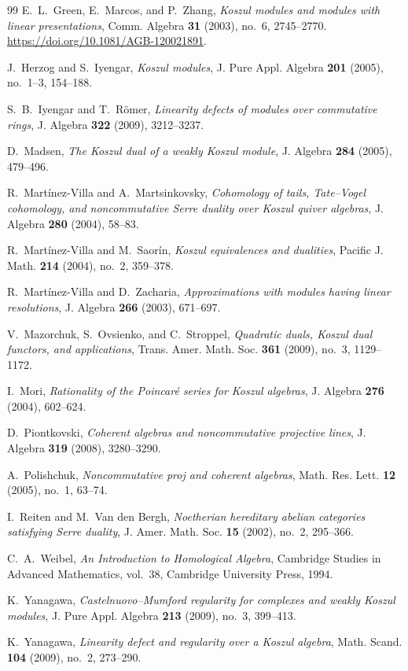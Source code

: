 \documentclass[11pt]{article}
\theoremstyle{definition}
\theoremstyle{remark}
\begin{document}
\begin{thebibliography}{99}
E.~L.~Green, E.~Marcos, and P.~Zhang,
\emph{Koszul modules and modules with linear presentations},
Comm. Algebra \textbf{31} (2003), no.~6, 2745--2770.
\url{https://doi.org/10.1081/AGB-120021891}.

J.~Herzog and S.~Iyengar,
\emph{Koszul modules},
J. Pure Appl. Algebra \textbf{201} (2005), no.~1--3, 154--188.

S.~B.~Iyengar and T.~R\"omer,
\emph{Linearity defects of modules over commutative rings},
J. Algebra \textbf{322} (2009), 3212--3237.

D.~Madsen,
\emph{The Koszul dual of a weakly Koszul module},
J. Algebra \textbf{284} (2005), 479--496.

R.~Mart\'inez-Villa and A.~Martsinkovsky,
\emph{Cohomology of tails, Tate--Vogel cohomology, and noncommutative Serre duality over Koszul quiver algebras},
J. Algebra \textbf{280} (2004), 58--83.

R.~Mart\'inez-Villa and M.~Saor\'in,
\emph{Koszul equivalences and dualities},
Pacific J. Math. \textbf{214} (2004), no.~2, 359--378.

R.~Mart\'inez-Villa and D.~Zacharia,
\emph{Approximations with modules having linear resolutions},
J. Algebra \textbf{266} (2003), 671--697.

V.~Mazorchuk, S.~Ovsienko, and C.~Stroppel,
\emph{Quadratic duals, Koszul dual functors, and applications},
Trans. Amer. Math. Soc. \textbf{361} (2009), no.~3, 1129--1172.

I.~Mori,
\emph{Rationality of the Poincar\'e series for Koszul algebras},
J. Algebra \textbf{276} (2004), 602--624.

D.~Piontkovski,
\emph{Coherent algebras and noncommutative projective lines},
J. Algebra \textbf{319} (2008), 3280--3290.

A.~Polishchuk,
\emph{Noncommutative proj and coherent algebras},
Math. Res. Lett. \textbf{12} (2005), no.~1, 63--74.

I.~Reiten and M.~Van den Bergh,
\emph{Noetherian hereditary abelian categories satisfying Serre duality},
J. Amer. Math. Soc. \textbf{15} (2002), no.~2, 295--366.

C.~A.~Weibel,
\emph{An Introduction to Homological Algebra},
Cambridge Studies in Advanced Mathematics, vol.~38,
Cambridge University Press, 1994.

K.~Yanagawa,
\emph{Castelnuovo--Mumford regularity for complexes and weakly Koszul modules},
J. Pure Appl. Algebra \textbf{213} (2009), no.~3, 399--413.

K.~Yanagawa,
\emph{Linearity defect and regularity over a Koszul algebra},
Math. Scand. \textbf{104} (2009), no.~2, 273--290.

\end{thebibliography}
\end{document}
